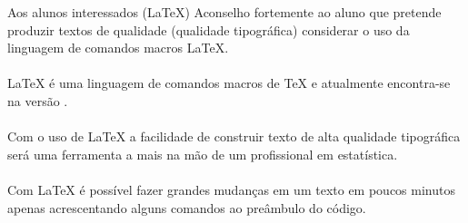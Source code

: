 \documentclass{beamer}
\begin{document}
\begin{frame}{Aos alunos interessados (\LaTeX)}
Aconselho fortemente ao aluno que pretende produzir textos de qualidade (qualidade tipográfica) considerar o uso da linguagem de comandos macros \LaTeX. \\~\\

\LaTeX \hspace{0.03cm} é uma linguagem de comandos macros de \TeX \hspace{0.03cm} e atualmente encontra-se na versão \LaTeXe.\\~\\

Com o uso de \LaTeX \hspace{0.03cm} a facilidade de construir texto de alta qualidade tipográfica será uma ferramenta a mais na mão de um profissional em estatística. \\~\\

Com \LaTeX \hspace{0.03cm} é possível fazer grandes mudanças em um texto em poucos minutos apenas acrescentando alguns comandos ao preâmbulo do código. 
\end{frame}

\end{document}
